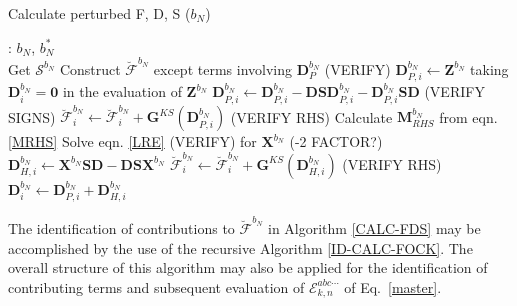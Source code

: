 \documentclass[%
 reprint,
 amsmath,amssymb,
 aps,
]{revtex4-1}
\begin{document}
\begin{algorithm}
\caption{Calculate perturbed F, D, S ($b_{N}$)}
\label{CALC-FDS}
\begin{algorithmic}
: $b_{N}$, $b_{N}^{*}$\\

\State Get $\bm{\mathcal{S}}^{b_N}$
\State Construct $\breve{\bm{\mathcal{F}}}^{b_N}$ except terms involving $\mathbf{D}_{P}^{b_N}$ (VERIFY)
\State  $\mathbf{D}_{P, i}^{b_N} \gets \mathbf{Z}^{b_N}$ taking $\mathbf{D}_{i}^{b_N} = \mathbf{0}$ in the evaluation of $\mathbf{Z}^{b_N}$
\State  $\mathbf{D}_{P, i}^{b_N} \gets \mathbf{D}_{P, i}^{b_N} - \mathbf{D} \mathbf{S} \mathbf{D}_{P, i}^{b_N} - \mathbf{D}_{P, i}^{b_N} \mathbf{S} \mathbf{D}$ (VERIFY SIGNS)
 \State $\breve{\bm{\mathcal{F}}}_{i}^{b_N} \gets \breve{\bm{\mathcal{F}}}_{i}^{b_N} + \mathbf{G}^{KS}(\mathbf{D}^{b_N}_{P, i})$ (VERIFY RHS) 
\State  Calculate $\mathbf{M}_{RHS}^{b_N}$ from eqn. \eqref{MRHS}
\State  Solve eqn. \eqref{LRE} (VERIFY) for $\mathbf{X}^{b_N}$ (-2 FACTOR?)
\State  $\mathbf{D}_{H, i}^{b_N} \gets \mathbf{X}^{b_N} \mathbf{S} \mathbf{D} - \mathbf{D} \mathbf{S} \mathbf{X}^{b_N}$
\State  $\breve{\bm{\mathcal{F}}}_{i}^{b_N} \gets \breve{\bm{\mathcal{F}}}_{i}^{b_N} + \mathbf{G}^{KS}(\mathbf{D}^{b_N}_{H, i})$ (VERIFY RHS)
\State  $\mathbf{D}_{i}^{b_N} \gets \mathbf{D}_{P, i}^{b_N} + \mathbf{D}_{H, i}^{b_N}$
\EndFor
\end{algorithmic}
\end{algorithm}

The identification of contributions to $\breve{\bm{\mathcal{F}}}^{b_N}$ in Algorithm \ref{CALC-FDS} may be accomplished by the use of the recursive Algorithm \ref{ID-CALC-FOCK}. The overall structure of this algorithm may also be applied for the identification of contributing terms and subsequent evaluation of $\mathcal{E}_{k,n}^{abc\cdots}$ of Eq.~\eqref{master}.

\end{document}
